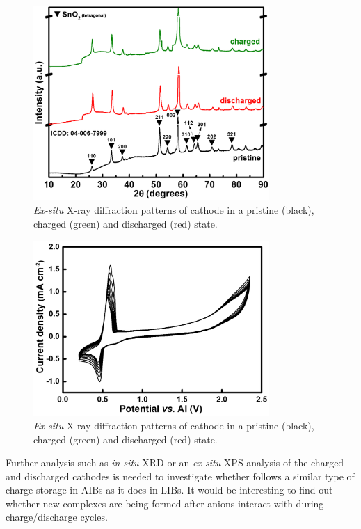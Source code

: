  \begin{figure}[th!]
  \centering
  \includegraphics[width=0.8\textwidth]{Figures/chap6fig/SnO2XRD}
    \caption{\textit{Ex-situ} X-ray diffraction patterns of  cathode in a pristine (black), charged (green) and discharged (red) state.}
  \label{Figures/chap6fig:SnO2XRD}
\end{figure}

 \begin{figure}[th!]
  \centering
  \includegraphics[width=0.8\textwidth]{Figures/chap6fig/Sno2CV}
    \caption{\textit{Ex-situ} X-ray diffraction patterns of  cathode in a pristine (black), charged (green) and discharged (red) state.}
  \label{Figures/chap6fig:Sno2CV}
\end{figure}

Further analysis such as \textit{in-situ} XRD or an \textit{ex-situ} XPS analysis of the charged and discharged cathodes is needed to investigate whether  follows a similar type of charge storage in AIBs as it does in LIBs. It would be interesting to find out whether new complexes are being formed after  anions interact with  during charge/discharge cycles. 


